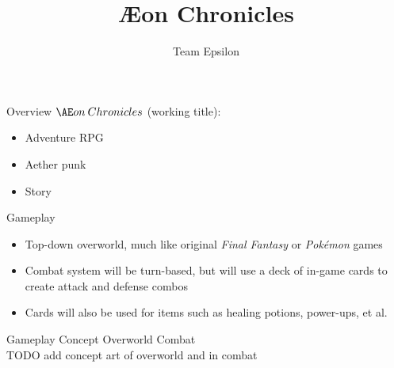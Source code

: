 \documentclass{teamepsilon}
\title{{\AE}on Chronicles}
\author{Team Epsilon}
\institute{Colorado School of Mines}
\begin{document}
\begin{frame}{Overview}
	$\AE on\:Chronicles$ (working title):\\
	\begin{itemize}
		\item Adventure RPG
		\item Aether punk
		\item Story
	\end{itemize}
\end{frame}

\begin{frame}{Gameplay}
    \begin{itemize}
        \item Top-down overworld, much like original \textit{Final Fantasy}
        or \textit{Pok\'emon} games
        \item Combat system will be turn-based, but will use a deck of in-game
        cards to create attack and defense combos
        \item Cards will also be used for items such as healing potions,
        power-ups, et al.
    \end{itemize}
\end{frame}

\begin{frame}{Gameplay Concept}
Overworld \hfill Combat \\
TODO add concept art of overworld and in combat
\end{frame}
\end{document}
